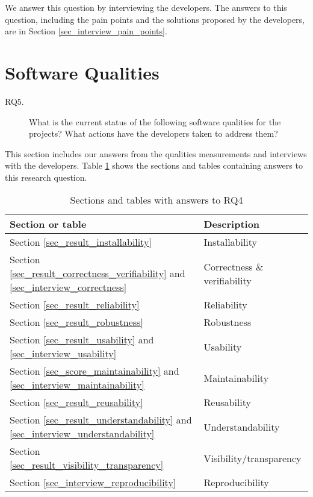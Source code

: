 We answer this question by interviewing the developers. The answers to this question, including the pain points and the solutions proposed by the developers, are in Section \ref{sec_interview_pain_points}.

\section{Software Qualities}
\label{sec_rq_qualities}
\begin{description}\item[RQ5.] What is the current status of the following software qualities for the projects? What actions have the developers taken to address them?\end{description}

This section includes our answers from the qualities measurements and interviews with the developers. Table \ref{tab_reference_rq4} shows the sections and tables containing answers to this research question.

\begin{table}[H]
\centering
\begin{tabular}{ll}
\hline
Section or table & Description \\ \hline
Section \ref{sec_result_installability} & Installability \\
Section \ref{sec_result_correctness_verifiability} and \ref{sec_interview_correctness} & Correctness \& verifiability \\
Section \ref{sec_result_reliability} & Reliability \\
Section \ref{sec_result_robustness} & Robustness \\
Section \ref{sec_result_usability} and \ref{sec_interview_usability}& Usability \\
Section \ref{sec_score_maintainability} and \ref{sec_interview_maintainability} & Maintainability \\
Section \ref{sec_result_reusability} & Reusability \\
Section \ref{sec_result_understandability} and \ref{sec_interview_understandability} & Understandability \\
Section \ref{sec_result_visibility_transparency} & Visibility/transparency \\
Section \ref{sec_interview_reproducibility} & Reproducibility \\ \hline
\end{tabular}
\caption{\label{tab_reference_rq4}Sections and tables with answers to RQ4}
\end{table}

